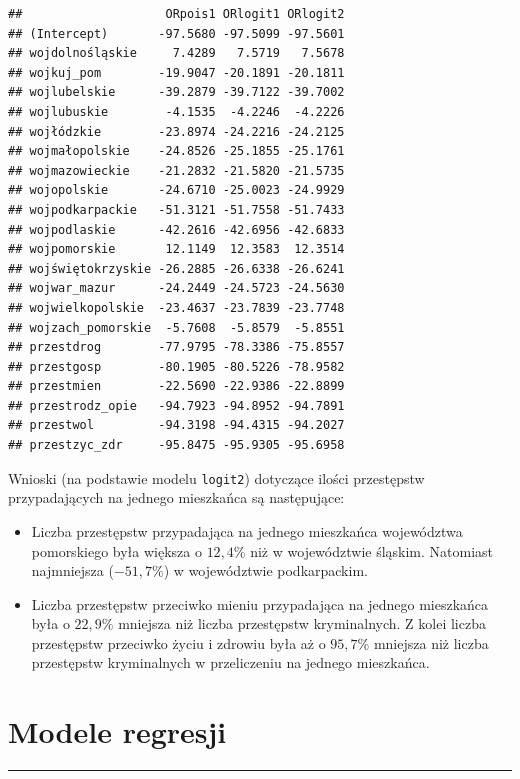 \documentclass[polish,]{book}
\begin{document}
\begin{verbatim}
##                    ORpois1 ORlogit1 ORlogit2
## (Intercept)       -97.5680 -97.5099 -97.5601
## wojdolnośląskie     7.4289   7.5719   7.5678
## wojkuj_pom        -19.9047 -20.1891 -20.1811
## wojlubelskie      -39.2879 -39.7122 -39.7002
## wojlubuskie        -4.1535  -4.2246  -4.2226
## wojłódzkie        -23.8974 -24.2216 -24.2125
## wojmałopolskie    -24.8526 -25.1855 -25.1761
## wojmazowieckie    -21.2832 -21.5820 -21.5735
## wojopolskie       -24.6710 -25.0023 -24.9929
## wojpodkarpackie   -51.3121 -51.7558 -51.7433
## wojpodlaskie      -42.2616 -42.6956 -42.6833
## wojpomorskie       12.1149  12.3583  12.3514
## wojświętokrzyskie -26.2885 -26.6338 -26.6241
## wojwar_mazur      -24.2449 -24.5723 -24.5630
## wojwielkopolskie  -23.4637 -23.7839 -23.7748
## wojzach_pomorskie  -5.7608  -5.8579  -5.8551
## przestdrog        -77.9795 -78.3386 -75.8557
## przestgosp        -80.1905 -80.5226 -78.9582
## przestmien        -22.5690 -22.9386 -22.8899
## przestrodz_opie   -94.7923 -94.8952 -94.7891
## przestwol         -94.3198 -94.4315 -94.2027
## przestzyc_zdr     -95.8475 -95.9305 -95.6958
\end{verbatim}

Wnioski (na podstawie modelu \texttt{logit2}) dotyczące ilości przestępstw przypadających
na jednego mieszkańca są następujące:

\begin{itemize}
\item
  Liczba przestępstw przypadająca na jednego mieszkańca województwa pomorskiego była większa o \(12,4\%\) niż w województwie śląskim. Natomiast najmniejsza (\(-51,7\%\)) w województwie podkarpackim.
\item
  Liczba przestępstw przeciwko mieniu przypadająca na jednego mieszkańca była o \(22,9\%\) mniejsza niż liczba przestępstw kryminalnych. Z kolei liczba przestępstw przeciwko życiu i zdrowiu była aż o \(95,7\%\) mniejsza niż liczba przestępstw kryminalnych w przeliczeniu na jednego mieszkańca.
\end{itemize}

\hypertarget{part_13}{%
\chapter{Modele regresji}\label{part_13}}

\begin{center}\rule{0.5\linewidth}{\linethickness}\end{center}
\end{document}
